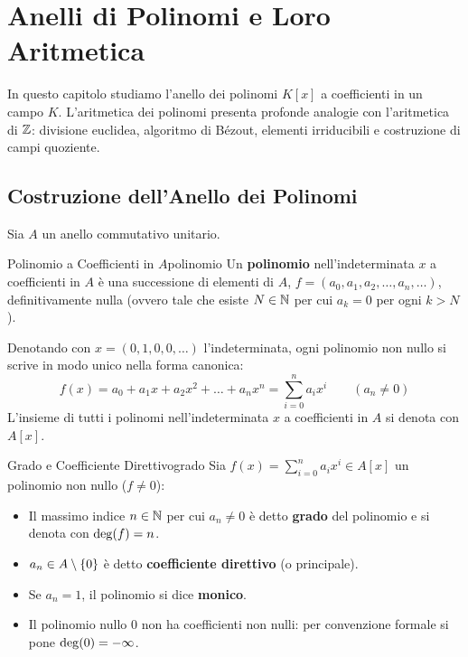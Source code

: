 \chapter{Anelli di Polinomi e Loro Aritmetica}
\label{chap:polinomi}

In questo capitolo studiamo l'anello dei polinomi $K[x]$ a coefficienti in un campo $K$. L'aritmetica dei polinomi presenta profonde analogie con l'aritmetica di $\mathbb{Z}$: divisione euclidea, algoritmo di Bézout, elementi irriducibili e costruzione di campi quoziente.

\section{Costruzione dell'Anello dei Polinomi}

Sia $A$ un anello commutativo unitario.

\begin{definizione}{Polinomio a Coefficienti in $A$}{polinomio}
Un \textbf{polinomio} nell'indeterminata $x$ a coefficienti in $A$ è una successione di elementi di $A$, $f = (a_0, a_1, a_2, \dots, a_n, \dots)$, definitivamente nulla (ovvero tale che esiste $N \in \mathbb{N}$ per cui $a_k = 0$ per ogni $k > N$).

Denotando con $x = (0, 1, 0, 0, \dots)$ l'indeterminata, ogni polinomio non nullo si scrive in modo unico nella forma canonica:
\[
    f(x) = a_0 + a_1 x + a_2 x^2 + \dots + a_n x^n = \sum_{i=0}^n a_i x^i \qquad (a_n \neq 0)
\]
L'insieme di tutti i polinomi nell'indeterminata $x$ a coefficienti in $A$ si denota con $A[x]$.
\end{definizione}

\begin{definizione}{Grado e Coefficiente Direttivo}{grado}
Sia $f(x) = \sum_{i=0}^n a_i x^i \in A[x]$ un polinomio non nullo ($f \neq 0$):
\begin{itemize}
    \item Il massimo indice $n \in \mathbb{N}$ per cui $a_n \neq 0$ è detto \textbf{grado} del polinomio e si denota con $\operatorname{deg}(f) = n$.
    \item $a_n \in A \setminus \{0\}$ è detto \textbf{coefficiente direttivo} (o principale).
    \item Se $a_n = 1$, il polinomio si dice \textbf{monico}.
    \item Il polinomio nullo $0$ non ha coefficienti non nulli: per convenzione formale si pone $\operatorname{deg}(0) = -\infty$.
\end{itemize}
\end{definizione}

